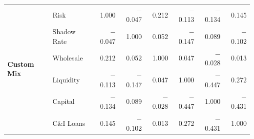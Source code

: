 \documentclass[12pt,a4paper]{report}
\begin{document}
\begin{table}[H]
{\begin{tabular}{ll rrrrrr}
\multirow{6}{*}{\textbf{Custom Mix}}
 & Risk          &  1.000 & $-$0.047 &  0.212 & $-$0.113 & $-$0.134 &  0.145 \\
 & Shadow Rate   & $-$0.047 &  1.000 &  0.052 & $-$0.147 &  0.089 & $-$0.102 \\
 & Wholesale     &  0.212 &  0.052 &  1.000 &  0.047 & $-$0.028 &  0.013 \\
 & Liquidity     & $-$0.113 & $-$0.147 &  0.047 &  1.000 & $-$0.447 &  0.272 \\
 & Capital       & $-$0.134 &  0.089 & $-$0.028 & $-$0.447 &  1.000 & $-$0.431 \\
 & C\&I Loans    &  0.145 & $-$0.102 &  0.013 &  0.272 & $-$0.431 &  1.000 \\

\bottomrule
\end{tabular}%
}
\end{table}
\end{document}
